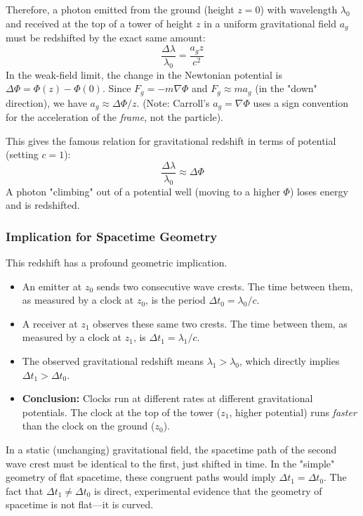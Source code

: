 \documentclass[11pt, a4paper]{report}
\begin{document}
Therefore, a photon emitted from the ground (height $z=0$) with wavelength $\lambda_0$ and received at the top of a tower of height $z$ in a uniform gravitational field $a_g$ must be redshifted by the exact same amount:
\begin{equation}
    \frac{\Delta \lambda}{\lambda_0} = \frac{a_g z}{c^2}
\end{equation}
In the weak-field limit, the change in the Newtonian potential is $\Delta \Phi = \Phi(z) - \Phi(0)$. Since $F_g = -m \nabla \Phi$ and $F_g \approx m a_g$ (in the "down" direction), we have $a_g \approx \Delta \Phi / z$. (Note: Carroll's $a_g = \nabla \Phi$ uses a sign convention for the acceleration of the \emph{frame}, not the particle).

This gives the famous relation for gravitational redshift in terms of potential (setting $c=1$):
\begin{equation}
    \frac{\Delta \lambda}{\lambda_0} \approx \Delta \Phi
\end{equation}
A photon "climbing" out of a potential well (moving to a higher $\Phi$) loses energy and is redshifted.

\subsubsection*{Implication for Spacetime Geometry}
This redshift has a profound geometric implication.










\begin{itemize}
    \item An emitter at $z_0$ sends two consecutive wave crests. The time between them, as measured by a clock at $z_0$, is the period $\Delta t_0 = \lambda_0 / c$.
    \item A receiver at $z_1$ observes these same two crests. The time between them, as measured by a clock at $z_1$, is $\Delta t_1 = \lambda_1 / c$.
    \item The observed gravitational redshift means $\lambda_1 > \lambda_0$, which directly implies $\Delta t_1 > \Delta t_0$.
    \item \textbf{Conclusion:} Clocks run at different rates at different gravitational potentials. The clock at the top of the tower ($z_1$, higher potential) runs \emph{faster} than the clock on the ground ($z_0$).
\end{itemize}
In a static (unchanging) gravitational field, the spacetime path of the second wave crest must be identical to the first, just shifted in time. In the "simple" geometry of flat spacetime, these congruent paths would imply $\Delta t_1 = \Delta t_0$. The fact that $\Delta t_1 \neq \Delta t_0$ is direct, experimental evidence that the geometry of spacetime is not flat---it is curved.
\end{document}
